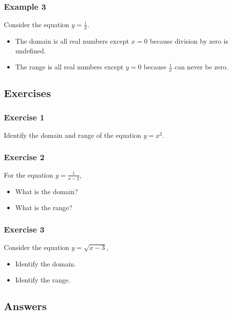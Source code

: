 \documentclass[12pt]{article}
\begin{document}
\subsubsection*{Example 3}

Consider the equation \( y = \frac{1}{x} \).

\begin{itemize}
    \item The domain is all real numbers except \( x = 0 \) because division by zero is undefined.
    \item The range is all real numbers except \( y = 0 \) because \( \frac{1}{x} \) can never be zero.
\end{itemize}

\subsection*{Exercises}

\subsubsection*{Exercise 1}

Identify the domain and range of the equation \( y = x^2 \).

\subsubsection*{Exercise 2}

For the equation \( y = \frac{1}{x - 2} \),

\begin{itemize}
    \item What is the domain?
    \item What is the range?
\end{itemize}

\subsubsection*{Exercise 3}

Consider the equation \( y = \sqrt{x - 3} \),

\begin{itemize}
    \item Identify the domain.
    \item Identify the range.
\end{itemize}

\subsection*{Answers}
\end{document}
